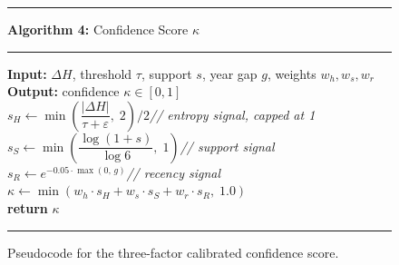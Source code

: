 \begin{figure}[H]
\centering
\begin{minipage}{0.82\textwidth}
\hrule\vspace{4pt}
\textbf{Algorithm 4:} Confidence Score $\kappa$
\vspace{4pt}\hrule\vspace{6pt}
\textbf{Input:} $\Delta H$, threshold $\tau$, support $s$, year gap $g$, weights $w_h, w_s, w_r$\\
\textbf{Output:} confidence $\kappa \in [0,1]$\\[4pt]
$s_H \leftarrow \min\!\left(\dfrac{|\Delta H|}{\tau + \varepsilon},\; 2\right) \big/ 2$\hfill\textit{// entropy signal, capped at 1}\\[6pt]
$s_S \leftarrow \min\!\left(\dfrac{\log(1+s)}{\log 6},\; 1\right)$\hfill\textit{// support signal}\\[6pt]
$s_R \leftarrow e^{-0.05 \cdot \max(0,\, g)}$\hfill\textit{// recency signal}\\[6pt]
$\kappa \leftarrow \min(w_h \cdot s_H + w_s \cdot s_S + w_r \cdot s_R,\; 1.0)$\\
\textbf{return} $\kappa$
\vspace{6pt}\hrule
\end{minipage}
\caption{Pseudocode for the three-factor calibrated confidence score.}
\label{alg:confidence}
\end{figure}


